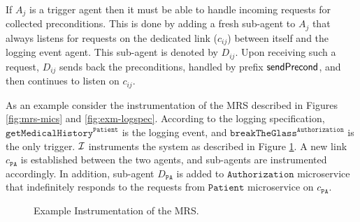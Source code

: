 If $A_j$ is a trigger agent then it must be able to handle incoming requests for collected preconditions. This is done by adding a fresh sub-agent to $A_j$ that always listens for requests on the dedicated link ($c_{ij}$) between itself and the logging event agent. This sub-agent is denoted by $D_{ij}$. Upon receiving such a request, $D_{ij}$ sends back the preconditions, handled by prefix $\mathsf{sendPrecond}$, and then continues to listen on $c_{ij}$.

As an example consider the instrumentation of the MRS described in Figures \ref{fig:mrs-mics} and \ref{fig:exm-logspec}. According to the logging specification, $\mathtt{getMedicalHistory}^{\mathtt{Patient}}$ is the logging event, and $\mathtt{breakTheGlass}^{\mathtt{Authorization}}$ is the only trigger. $\mathcal{I}$ instruments the system as described in Figure \ref{fig:exm-inst}.  A new link $c_{\mathtt{PA}}$ is established between the two agents, and sub-agents are instrumented accordingly. In addition, sub-agent $D_{\mathtt{PA}}$ is added to $\mathtt{Authorization}$ microservice that indefinitely responds to the requests from $\mathtt{Patient}$ microservice on $c_{\mathtt{PA}}$.

\begin{figure}
\setlength{\fboxsep}{0pt}%
\caption{Example Instrumentation of the MRS.}
\label{fig:exm-inst}
\end{figure}

